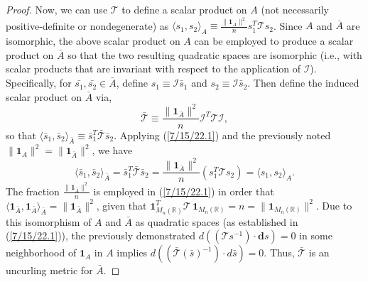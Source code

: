 \documentclass{amsart}
\theoremstyle{definition}
\numberwithin{theorem}{section}
\numberwithin{equation}{section}
\begin{document}
\begin{proof}
   Now, we can use $\mathcal{\mathcal{T}}$ to define a scalar product on $A$ (not necessarily positive-definite or nondegenerate) as $\langle s_1,s_2\rangle_A \equiv  \frac{\|\mathbf{1}_{A}\|^2}{n}s_1^T \mathcal{\mathcal{T}} s_2$. 
    Since $A$ and $\bar{A}$ are isomorphic, the above scalar product on $A$ can be employed to produce a scalar product on $\bar{A}$ so that the two resulting quadratic spaces are isomorphic (i.e., with scalar products that are invariant with respect to the application of $\mathcal{I}$).  Specifically, for $\bar{s_1},\bar{s_2}\in\bar{A}$, define $s_1 \equiv \mathcal{I}\bar{s}_1$ and $s_2 \equiv \mathcal{I}\bar{s}_2$.  Then define the induced scalar product on $\bar{A}$ via, \begin{equation}\label{7/15/22.1} \bar{\mathcal{\mathcal{T}}} \equiv  \frac{\|\mathbf{1}_{\bar{A}}\|^2}{n}\mathcal{I}^T\mathcal{\mathcal{T}}\mathcal{I},\end{equation} so that $\langle \bar{s}_1,\bar{s}_2\rangle_{\bar{A}} \equiv \bar{s}_1^T \bar{\mathcal{\mathcal{T}}} \bar{s}_2$.  Applying (\ref{7/15/22.1}) and the previously noted $\|\mathbf{1}_A\|^2 = \|\mathbf{1}_{\bar{A}}\|^2$, we have \begin{equation}\label{8/25/22.1} \langle \bar{s}_1,\bar{s}_2\rangle_{\bar{A}} = \bar{s}_1^T \bar{\mathcal{T}} \bar{s}_2 = \frac{\|\mathbf{1}_{\bar{A}}\|^2}{n}( s_1^T \mathcal{T} s_2) = \langle s_1,s_2\rangle_{A}.\end{equation}  The fraction $\frac{\|\mathbf{1}_{\bar{A}}\|^2}{n}$ is employed in (\ref{7/15/22.1}) in order that $\langle \mathbf{1}_{\bar{A}},\mathbf{1}_{\bar{A}}\rangle_{\bar{A}} = \|\mathbf{1}_{\bar{A}}\|^2$, given that $\mathbf{1}_{M_n(\mathbb{R})}^T \mathcal{T}\,\mathbf{1}_{M_n(\mathbb{R})} = n = \|\mathbf{1}_{M_n(\mathbb{R})}\|^2$. Due to this isomorphism of $A$ and $\bar{A}$ as quadratic spaces (as established in (\ref{7/15/22.1})), the previously demonstrated $d((\mathcal{T}s^{-1})\cdot \mathbf{d}s) = 0$ in some neighborhood of $\mathbf{1}_A$ in $A$ implies 
\mbox{$d((\bar{\mathcal{T}}(\bar{s})^{-1})\cdot d\bar{s}) = 0$.} Thus, $\bar{\mathcal{T}}$ is an uncurling metric for $\bar{A}$.



\end{proof}
\end{document}
